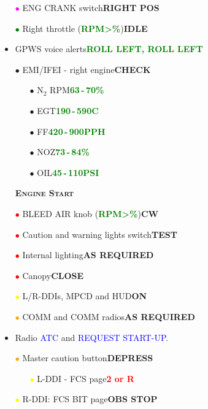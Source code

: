 \documentclass[a4paper,12pt,dvipsnames]{letter}
\newcommand{\radio}[1]{\textcolor{blue}{#1}}
\newcommand{\button}[1]{\textbf{#1}}
\newcommand{\degC}{\textdegree{}C}
\newcommand{\ok}[1]{\textcolor{Green}{\textbf{#1}}}
\newcommand{\warn}[1]{\textcolor{Red}{\textbf{#1}}}
\newcommand{\myHead}[1]{{\LARGE\textsc{\textbf{#1}}}}
\newcommand{\bi}{\textcolor{ProcessBlue}{$\bullet$\;}}
\newcommand{\ri}{\textcolor{Red}{$\bullet$\;}}
\newcommand{\gi}{\textcolor{Green}{$\bullet$\;}}
\newcommand{\yi}{\textcolor{Yellow}{$\bullet$\;}}
\newcommand{\mi}{\textcolor{Magenta}{$\bullet$\;}}
\newcommand{\oi}{\textcolor{Orange}{$\bullet$\;}}
\renewcommand{\ni}{\textcolor{Brown}{$\bullet$\;}}
\begin{document}
{\begin{itemize}
 \begin{itemize}
  \item[\ni] APU ACC caution light\dotfill\ok{ON}
  \item[\mi] APU READY light\dotfill\ok{GREEN}
 \end{itemize}
 \item[\mi] ENG CRANK switch\dotfill\button{RIGHT POS}
 \item[\gi] Right throttle (\ok{RPM\;>\%})\dotfill\button{IDLE}
 \item GPWS voice alerts\dotfill\dotfill\ok{ROLL LEFT, ROLL LEFT}
 \item[\bi]EMI/IFEI - right engine\dotfill\button{CHECK}
 \begin{itemize}
  \item[\bi] N$_2$ RPM\dotfill\ok{63\,-\,70\%}
  \item[\bi] EGT\dotfill\ok{190\,-\,590\degC}
  \item[\bi] FF\dotfill\ok{420\,-\,900\;PPH}
  \item[\bi] NOZ\dotfill\ok{73\,-\,84\%}
  \item[\bi] OIL\dotfill\ok{45\,-\,110\;PSI}
 \end{itemize}
\end{itemize}
\newpage
\begin{itemize}
 \item[] \myHead{Engine Start} 
 \item[\ri] BLEED AIR knob (\ok{RPM\;>\%})\dotfill\button{CW\textdegree}
 \item[\ri] Caution and warning lights switch\dotfill\button{TEST}
 \item[\ri] Internal lighting\dotfill\button{AS REQUIRED}
 \item[\ri] Canopy\dotfill\button{CLOSE}
 \item[\yi] L/R-DDIs, MPCD and HUD\dotfill\button{ON}
 \item[\oi] COMM and COMM radios\dotfill\button{AS REQUIRED}
 \item Radio \radio{ATC} and \radio{REQUEST START-UP}.
 \item[\oi] Master caution button\dotfill\button{DEPRESS}
 \begin{itemize}
  \item[\yi] L-DDI - FCS page\dotfill\warn{2 or R}
 \end{itemize}
 \item[\yi] R-DDI: FCS BIT page\dotfill\button{OBS STOP}

\end{itemize}}
\end{document}
